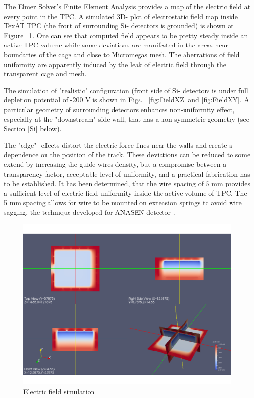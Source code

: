 \documentclass[final,number,sort&compress,5p,times,twocolumn]{elsarticle}
\begin{document}
The  Elmer Solver's Finite Element Analysis provides a  map of the electric field at every point in the TPC. A simulated 3D- plot of electrostatic field map inside TexAT TPC (the front of surrounding Si- detectors is grounded) is  shown at  Figure ~\ref{fig:Field3D}.  One can see that computed field appears to be pretty steady inside an active TPC volume while some deviations are  manifested in the areas near  boundaries of the cage and close to Micromegas mesh.  The aberrations of field uniformity  are apparently  induced by the leak of electric field through the transparent cage and mesh. 

The simulation of  "realistic" configuration (front side of Si- detectors is under full depletion potential of -200 V is shown in Figs. ~\ref{fig:FieldXZ} and \ref{fig:FieldXY}. A particular geometry of surrounding detectors enhances non-uniformity effect, especially at the "downstream"-side  wall, that has a non-symmetric  geometry (see Section \ref{Si} below).

The "edge"-  effects distort the electric force lines near the  walls and create a dependence on the position of the track. These deviations can be reduced to some extend by increasing the guide wires density, but a compromise between a transparency factor, acceptable level of uniformity, and a practical fabrication has to be established. It has been determined, that the wire spacing of 5 mm provides a sufficient level of electric field uniformity inside the active volume of TPC.  The 5 mm spacing allows for wire to be mounted on extension springs to avoid wire sagging, the technique developed for ANASEN detector \cite{ANASEN}.
		 		 
\begin{figure}[hbt!]
    \centering
 \includegraphics[width=1.0\columnwidth]{Figs/Field3D}	
    \caption{Electric field simulation}
     \label{fig:Field3D} 
\end{figure}
		
\end{document}
